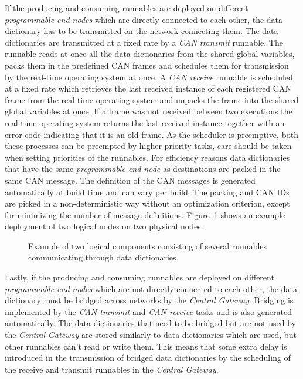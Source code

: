If the producing and consuming runnables are deployed on different \textit{programmable end nodes} which are directly connected to each other, the data dictionary has to be transmitted on the network connecting them. The data dictionaries are transmitted at a fixed rate by a \textit{CAN transmit} runnable. The runnable reads at once all the data dictionaries from the shared global variables, packs them in the predefined CAN frames and schedules them for transmission by the real-time operating system at once. A \textit{CAN receive} runnable is scheduled at a fixed rate which retrieves the last received instance of each registered CAN frame from the real-time operating system and unpacks the frame into the shared global variables at once. If a frame was not received between two executions the real-time operating system returns the last received instance together with an error code indicating that it is an old frame. As the scheduler is preemptive, both these processes can be preempted by higher priority tasks, care should be taken when setting priorities of the runnables. For efficiency reasons data dictionaries that have the same \textit{programmable end node} as destinations are packed in the same CAN message. The definition of the CAN messages is generated automatically at build time and can vary per build. The packing and CAN IDs are picked in a non-deterministic way without an optimization criterion, except for minimizing the number of message definitions. Figure~\ref{fig:physical_example} shows an example deployment of two logical nodes on two physical nodes.

\begin{figure}[htb]
    \centering
 \caption{Example of two logical components consisting of several runnables communicating through data dictionaries}
\label{fig:physical_example}
\end{figure}

Lastly, if the producing and consuming runnables are deployed on different \textit{programmable end nodes} which are not directly connected to each other, the data dictionary must be bridged across networks by the \textit{Central Gateway}. Bridging is implemented by the \textit{CAN transmit} and \textit{CAN receive} tasks and is also generated automatically. The data dictionaries that need to be bridged but are not used by the \textit{Central Gateway} are stored similarly to data dictionaries which are used, but other runnables can't read or write them. This means that some extra delay is introduced in the transmission of bridged data dictionaries by the scheduling of the receive and transmit runnables in the \textit{Central Gateway}.

